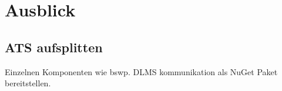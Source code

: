 \chapter{Ausblick}

\section{ATS aufsplitten}\label{ausblick:ats_split}
Einzelnen Komponenten wie bswp. DLMS kommunikation als NuGet Paket bereitstellen.
